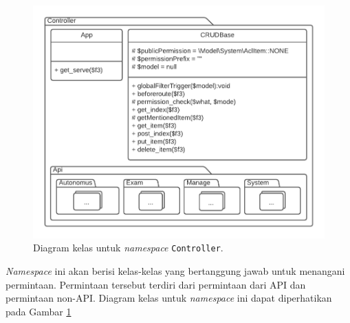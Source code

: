     \begin{figure}
        \centering
        \includegraphics[width=0.6\paperwidth]{Gambar/classmap-be/Classmap - app-controller.pdf}
        \caption{Diagram kelas untuk \textit{namespace} \texttt{Controller}.}
        \label{fig:classmap_app-controller}
    \end{figure}

    \textit{Namespace} ini akan berisi kelas-kelas yang bertanggung jawab untuk
    menangani permintaan. Permintaan tersebut terdiri dari permintaan dari API
    dan permintaan non-API. Diagram kelas untuk \textit{namespace} ini dapat
    diperhatikan pada Gambar
    \ref{fig:classmap_app-controller}
    
